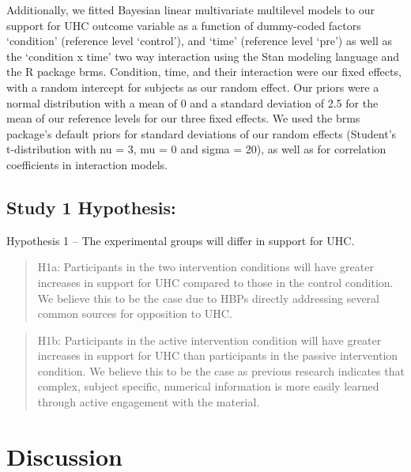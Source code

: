 \documentclass[
  english,
  man]{apa6}
\begin{document}
Additionally, we fitted Bayesian linear multivariate multilevel models to our support for UHC outcome variable as a function of dummy-coded factors `condition' (reference level `control'), and `time' (reference level `pre') as well as the `condition x time' two way interaction using the Stan modeling language and the R package brms. Condition, time, and their interaction were our fixed effects, with a random intercept for subjects as our random effect. Our priors were a normal distribution with a mean of 0 and a standard deviation of 2.5 for the mean of our reference levels for our three fixed effects. We used the brms package's default priors for standard deviations of our random effects (Student's t-distribution with nu = 3, mu = 0 and sigma = 20), as well as for correlation coefficients in interaction models.

\hypertarget{study-1-hypothesis-1}{%
\subsection{Study 1 Hypothesis:}\label{study-1-hypothesis-1}}

Hypothesis 1 -- The experimental groups will differ in support for UHC.

\begin{quote}
H1a: Participants in the two intervention conditions will have greater increases in support for UHC compared to those in the control condition. We believe this to be the case due to HBPs directly addressing several common sources for opposition to UHC.
\end{quote}

\begin{quote}
H1b: Participants in the active intervention condition will have greater increases in support for UHC than participants in the passive intervention condition. We believe this to be the case as previous research indicates that complex, subject specific, numerical information is more easily learned through active engagement with the material.
\end{quote}

\hypertarget{discussion-1}{%
\section{Discussion}\label{discussion-1}}
\end{document}
